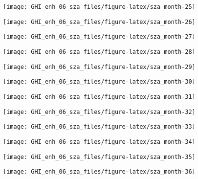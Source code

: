 \documentclass[
  10pt,
  a4paper,oneside]{article}
\begin{document}
\begin{center}\texttt{[image: GHI\_enh\_06\_sza\_files/figure-latex/sza\_month-25]} \end{center}

\begin{center}\texttt{[image: GHI\_enh\_06\_sza\_files/figure-latex/sza\_month-26]} \end{center}

\begin{center}\texttt{[image: GHI\_enh\_06\_sza\_files/figure-latex/sza\_month-27]} \end{center}

\begin{center}\texttt{[image: GHI\_enh\_06\_sza\_files/figure-latex/sza\_month-28]} \end{center}

\begin{center}\texttt{[image: GHI\_enh\_06\_sza\_files/figure-latex/sza\_month-29]} \end{center}

\begin{center}\texttt{[image: GHI\_enh\_06\_sza\_files/figure-latex/sza\_month-30]} \end{center}

\begin{center}\texttt{[image: GHI\_enh\_06\_sza\_files/figure-latex/sza\_month-31]} \end{center}

\begin{center}\texttt{[image: GHI\_enh\_06\_sza\_files/figure-latex/sza\_month-32]} \end{center}

\begin{center}\texttt{[image: GHI\_enh\_06\_sza\_files/figure-latex/sza\_month-33]} \end{center}

\begin{center}\texttt{[image: GHI\_enh\_06\_sza\_files/figure-latex/sza\_month-34]} \end{center}

\begin{center}\texttt{[image: GHI\_enh\_06\_sza\_files/figure-latex/sza\_month-35]} \end{center}

\begin{center}\texttt{[image: GHI\_enh\_06\_sza\_files/figure-latex/sza\_month-36]} \end{center}
\end{document}
